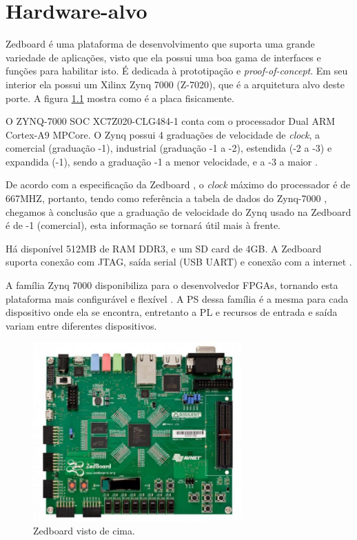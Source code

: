 \chapter{Hardware-alvo}

Zedboard é uma plataforma de desenvolvimento que suporta uma grande variedade de aplicações, visto que ela possui uma boa gama de interfaces e funções para habilitar isto. É dedicada à prototipação e \emph{proof-of-concept}. Em seu interior ela possui um Xilinx Zynq 7000 (Z-7020), que é a arquitetura alvo deste porte. A figura \ref{fig:zed} mostra como é a placa fisicamente.

O ZYNQ-7000 SOC XC7Z020-CLG484-1 conta com o processador Dual ARM Cortex-A9 MPCore. O Zynq possui 4 graduações de velocidade de \emph{clock}, a comercial (graduação -1), industrial (graduação -1 a -2), estendida (-2 a -3) e expandida (-1), sendo a graduação -1 a menor velocidade, e a -3 a maior \cite{product_table}.

De acordo com a especificação da Zedboard \cite{zedboard}, o \emph{clock} máximo do processador é de 667MHZ, portanto, tendo como referência a tabela de dados do Zynq-7000 \cite[p.~13]{data_sheet}, chegamos à conclusão que a graduação de velocidade do Zynq usado na Zedboard é de -1 (comercial), esta informação se tornará útil mais à frente.

Há disponível 512MB de RAM DDR3, e um SD card de 4GB. A Zedboard suporta conexão com JTAG, saída serial (USB UART) e conexão com a internet \cite{xilinx}.

A família Zynq 7000 disponibiliza para o desenvolvedor FPGAs, tornando esta plataforma mais configurável e flexível \cite[p.~26]{ug585}. A PS dessa família é a mesma para cada dispositivo onde ela se encontra, entretanto a PL e recursos de entrada e saída variam entre diferentes dispositivos. 


\begin{figure}[ht!]
	\label{fig:zed}
    \centering
    \includegraphics[width=8cm]{figuras/zedboard}
    \caption{Zedboard visto de cima.}
\end{figure}

